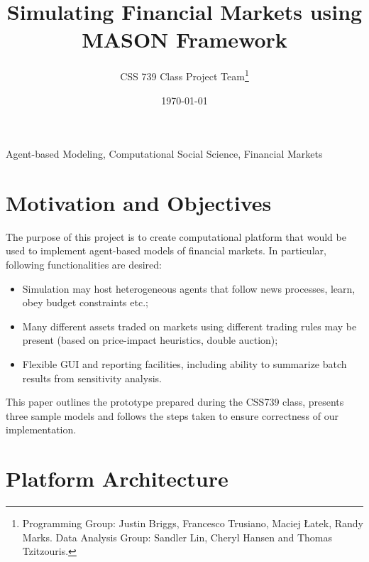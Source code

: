 \documentclass[runningheads]{llncs}
\newcommand{\keywords}[1]{\par\addvspace\baselineskip
\noindent\keywordname\enspace\ignorespaces#1}
\begin{document}
\mainmatter

\title{Simulating Financial Markets using MASON Framework}


\author{CSS 739 Class Project Team\thanks{Programming Group: Justin Briggs, Francesco Trusiano, Maciej \L atek, Randy Marks. Data Analysis Group: Sandler Lin, Cheryl Hansen and Thomas Tzitzouris.}}





\date{\today}
\maketitle

\keywords{Agent-based Modeling, Computational Social Science, Financial Markets}

\section{Motivation and Objectives}

The purpose of this project is to create computational platform that would be used to implement agent-based models of financial markets. In particular, following functionalities are desired:

\begin{itemize}
	\item Simulation may host heterogeneous agents that follow news processes, learn, obey budget constraints etc.;
	\item Many different assets traded on markets using different trading rules may be present (based on price-impact heuristics, double auction);
	\item Flexible GUI and reporting facilities, including ability to summarize batch results from sensitivity analysis.
\end{itemize}

This paper outlines the prototype prepared during the CSS739 class, presents three sample models and follows the steps taken to ensure correctness of our implementation. 

\section{Platform Architecture}
\end{document}
